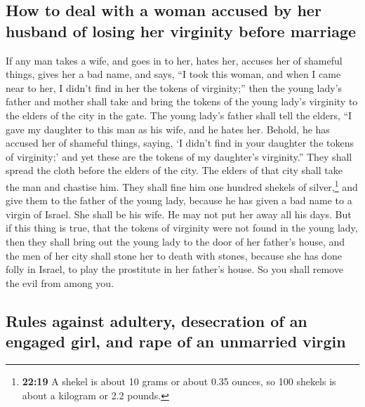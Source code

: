 \hypertarget{how-to-deal-with-a-woman-accused-by-her-husband-of-losing-her-virginity-before-marriage}{%
\subsection{How to deal with a woman accused by her husband of losing
her virginity before
marriage}\label{how-to-deal-with-a-woman-accused-by-her-husband-of-losing-her-virginity-before-marriage}}

 If any man takes a wife, and goes in to her, hates her,
 accuses her of shameful things, gives her a bad name,
and says, ``I took this woman, and when I came near to her, I didn't
find in her the tokens of virginity;''  then the young
lady's father and mother shall take and bring the tokens of the young
lady's virginity to the elders of the city in the gate. 
The young lady's father shall tell the elders, ``I gave my daughter to
this man as his wife, and he hates her.  Behold, he has
accused her of shameful things, saying, `I didn't find in your daughter
the tokens of virginity;' and yet these are the tokens of my daughter's
virginity.'' They shall spread the cloth before the elders of the city.
 The elders of that city shall take the man and chastise
him.  They shall fine him one hundred shekels of
silver,\footnote{\textbf{22:19} A shekel is about 10 grams or about 0.35
  ounces, so 100 shekels is about a kilogram or 2.2 pounds.} and give
them to the father of the young lady, because he has given a bad name to
a virgin of Israel. She shall be his wife. He may not put her away all
his days.  But if this thing is true, that the tokens of
virginity were not found in the young lady,  then they
shall bring out the young lady to the door of her father's house, and
the men of her city shall stone her to death with stones, because she
has done folly in Israel, to play the prostitute in her father's house.
So you shall remove the evil from among you.

\hypertarget{rules-against-adultery-desecration-of-an-engaged-girl-and-rape-of-an-unmarried-virgin}{%
\subsection{Rules against adultery, desecration of an engaged girl, and
rape of an unmarried
virgin}\label{rules-against-adultery-desecration-of-an-engaged-girl-and-rape-of-an-unmarried-virgin}}

